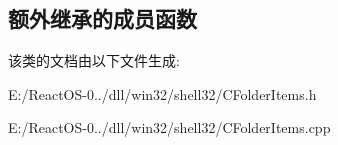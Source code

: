 \subsection*{额外继承的成员函数}


该类的文档由以下文件生成\+:\begin{DoxyCompactItemize}
\item 
E\+:/\+React\+O\+S-\/0../dll/win32/shell32/C\+Folder\+Items.\+h\item 
E\+:/\+React\+O\+S-\/0../dll/win32/shell32/C\+Folder\+Items.\+cpp\end{DoxyCompactItemize}
